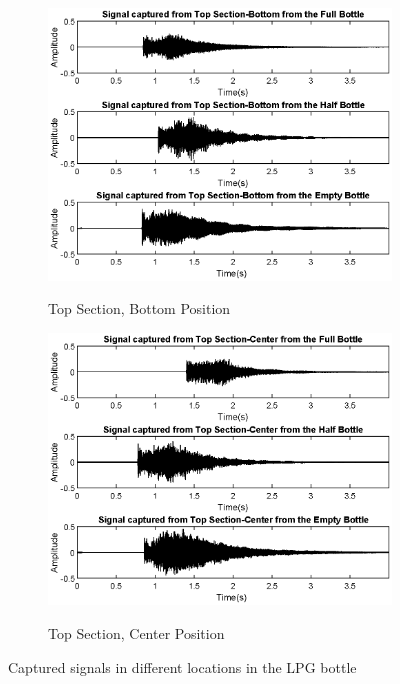 \begin{figure}[]
\begin{subfigure}{0.45\textwidth}
        \label{subfig:timeLowCenMic}
    \end{subfigure}
    \begin{subfigure}{0.45\textwidth}
        \centering
        \includegraphics[width=\linewidth]{Chapters/6CHP/Figures/TimeTopBottom.eps}
        \caption{Top Section, Bottom Position}{}
        \label{subfig:timeTopBotMic}
    \end{subfigure}
    \begin{subfigure}{0.45\textwidth}
        \centering
        \includegraphics[width=\linewidth]{Chapters/6CHP/Figures/TimeTopCenter.eps}
        \caption{Top Section, Center Position}{}
        \label{subfig:timeTopCenMic}
    \end{subfigure}
    \caption{Captured signals in different locations in the LPG bottle}{}
     \label{fig:TimeRealDataMic}
\end{figure}


